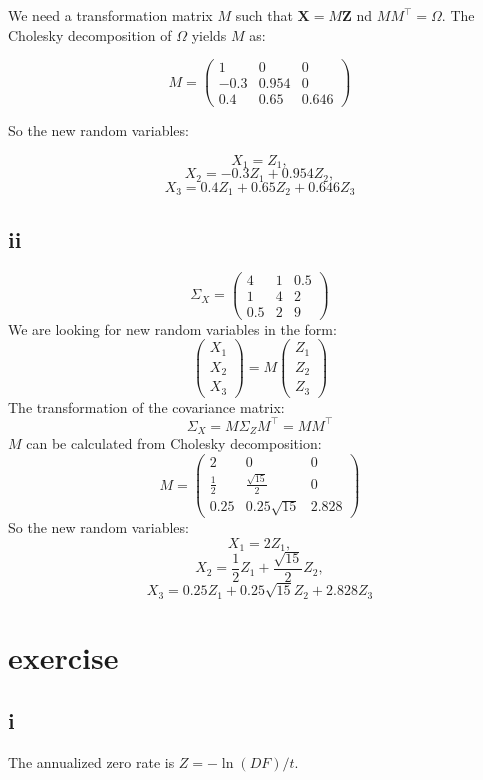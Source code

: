 \documentclass{article}
\begin{document}
We need a transformation matrix \(M\) such that $\mathbf X = M \mathbf Z $
nd \(M M^\top = \Omega\).
The Cholesky decomposition of \(\Omega\) yields \(M\) as:

\[
    M = \begin{pmatrix}
        1    & 0     & 0     \\
        -0.3 & 0.954 & 0     \\
        0.4  & 0.65  & 0.646
    \end{pmatrix}
\]

So the new random variables:

\[
    X_1 = Z_1,
\]
\[
    X_2 = -0.3 Z_1 + 0.954 Z_2,
\]
\[
    X_3 = 0.4 Z_1 + 0.65 Z_2 + 0.646 Z_3
\]
\subsection*{ii}
\[
    \Sigma_X = \begin{pmatrix} 4 & 1 & 0.5 \\ 1 & 4 & 2 \\ 0.5 & 2 & 9 \end{pmatrix}
\]
We are looking for new random variables in the form:
\[
    \begin{pmatrix}
        X_1 \\
        X_2 \\
        X_3
    \end{pmatrix}
    = M \begin{pmatrix}
        Z_1 \\
        Z_2 \\
        Z_3
    \end{pmatrix}
\]
The transformation of the covariance matrix:
\[
    \Sigma_X = M \Sigma_Z M^\top = MM^\top
\]
$M$ can be calculated from Cholesky decomposition:
\[
    M = \begin{pmatrix}
        2           & 0                   & 0     \\
        \frac{1}{2} & \frac{\sqrt{15}}{2} & 0     \\
        0.25        & 0.25\sqrt{15}       & 2.828
    \end{pmatrix}
\]
So the new random variables:
\[
    X_1 = 2Z_1,
\]
\[
    X_2 = \frac{1}{2}Z_1 + \frac{\sqrt{15}}{2}Z_2,
\]
\[
    X_3 = 0.25Z_1 + 0.25\sqrt{15}Z_2 + 2.828 Z_3
\]
\section{exercise}
\subsection*{i}
The annualized zero rate is $Z =  - \ln \left( {DF} \right)/t$.
\end{document}
